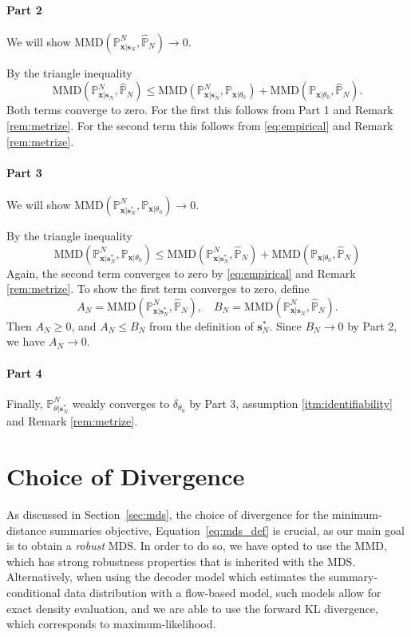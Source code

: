 \documentclass{article}
\theoremstyle{plain}
\theoremstyle{definition}
\theoremstyle{remark}
\begin{document}
\paragraph{Part 2}
We will show
$\mathrm{MMD}(\mathbb{P}^N_{\mathbf{x}|\mathbf{s}_N}, \hat{\mathbb{P}}_N ) \to 0$.

By the triangle inequality
\[
\mathrm{MMD}(\mathbb{P}^N_{\mathbf{x}|\mathbf{s}_N}, \hat{\mathbb{P}}_N)
\leq \mathrm{MMD}(\mathbb{P}^N_{\mathbf{x}|\mathbf{s}_N}, \mathbb{P}_{\mathbf{x}|\theta_0})
+ \mathrm{MMD}(\mathbb{P}_{\mathbf{x}|\theta_0}, \hat{\mathbb{P}}_N).
\]
Both terms converge to zero.
For the first this follows from Part 1 and Remark \ref{rem:metrize}.
For the second term this follows from \eqref{eq:empirical} and Remark \ref{rem:metrize}.

\paragraph{Part 3}
We will show
$\mathrm{MMD}(\mathbb{P}^N_{\mathbf{x}|\mathbf{s}^*_N}, \mathbb{P}_{\mathbf{x}|\theta_0}) \to 0$.

By the triangle inequality
\[
\mathrm{MMD}(\mathbb{P}^N_{\mathbf{x}|\mathbf{s}^*_N}, \mathbb{P}_{\mathbf{x}|\theta_0})
\leq \mathrm{MMD}(\mathbb{P}^N_{\mathbf{x}|\mathbf{s}^*_N}, \hat{\mathbb{P}}_N)
+ \mathrm{MMD}(\mathbb{P}_{\mathbf{x}|\theta_0}, \hat{\mathbb{P}}_N)
\]
Again, the second term converges to zero by \eqref{eq:empirical} and Remark \ref{rem:metrize}.
To show the first term converges to zero, define
\[
A_N = \mathrm{MMD}(\mathbb{P}^N_{\mathbf{x}|\mathbf{s}^*_N}, \hat{\mathbb{P}}_N), \quad
B_N = \mathrm{MMD}(\mathbb{P}^N_{\mathbf{x}|\mathbf{s}_N}, \hat{\mathbb{P}}_N).
\]
Then $A_N \geq 0$, and $A_N \leq B_N$ from the definition of $\mathbf{s}^*_N$.
Since $B_N \to 0$ by Part 2, we have $A_N \to 0$.

\paragraph{Part 4}

Finally,
$\mathbb{P}^N_{\theta | \mathbf{s}_N^*}$ weakly converges to $\delta_{\theta_0}$
by Part 3, assumption \ref{itm:identifiability} and Remark \ref{rem:metrize}.

\section{Choice of Divergence}
\label{app:div}

As discussed in Section~\ref{sec:mds}, the choice of divergence for the minimum-distance summaries objective, Equation~\eqref{eq:mds_def} is crucial, as our main goal is to obtain a \emph{robust} MDS. In order to do so, we have opted to use the MMD, which has strong robustness properties that is inherited with the MDS. Alternatively, when using the decoder model which estimates the summary-conditional data distribution with a flow-based model, such models allow for exact density evaluation, and we are able to use the forward KL divergence, which corresponds to maximum-likelihood. 
\end{document}
